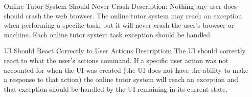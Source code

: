     \begin{section}{Online Tutor System Should Never Crash}
        Description: Nothing any user does should crash the web browser.  The online tutor system may 
        reach an exception when performing a specific task, but it will never crash the user’s browser 
        or machine.  Each online tutor system task exception should be handled.
    \end{section}
    
    \begin{section}{UI Should React Correctly to User Actions}
        Description: The UI should correctly react to what the user’s actions command.  
        If a specific user action was not accounted for when the UI was created (the UI does not have the 
        ability to make a response to that action) the online tutor system will reach an exception and that 
        exception should be handled by the UI remaining in its current state.
    \end{section}
    
